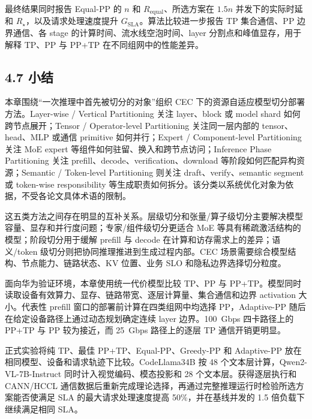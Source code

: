 最终结果同时报告 Equal-PP 的 \(n\) 和 \(R_{\mathrm{equal}}\)、所选方案在 \(1.5n\) 并发下的实际时延和 \(R_{\star}\)，以及请求处理速度提升 \(G_{\mathrm{SLA}}\)。算法比较进一步报告 TP 集合通信、PP 边界通信、各 stage 的计算时间、流水线空泡时间、layer 分割点和峰值显存，用于解释 TP、PP 与 PP+TP 在不同组网中的性能差异。
\subsection*{4.7 小结}

本章围绕“一次推理中首先被切分的对象”组织 CEC 下的资源自适应模型切分部署方法。Layer-wise / Vertical Partitioning 关注 layer、block 或 model shard 如何跨节点展开；Tensor / Operator-level Partitioning 关注同一层内部的 tensor、head、MLP 或通信 primitive 如何并行；Expert / Component-level Partitioning 关注 MoE expert 等组件如何驻留、换入和跨节点访问；Inference Phase Partitioning 关注 prefill、decode、verification、download 等阶段如何匹配异构资源；Semantic / Token-level Partitioning 则关注 draft、verify、semantic segment 或 token-wise responsibility 等生成职责如何拆分。该分类以系统优化对象为依据，不受各论文具体术语的限制。

这五类方法之间存在明显的互补关系。层级切分和张量/算子级切分主要解决模型容量、显存和并行度问题；专家/组件级切分更适合 MoE 等具有稀疏激活结构的模型；阶段切分用于缓解 prefill 与 decode 在计算和访存需求上的差异；语义/token 级切分则把协同推理推进到生成过程内部。CEC 场景需要综合模型结构、节点能力、链路状态、KV 位置、业务 SLO 和隐私边界选择切分粒度。

面向华为验证环境，本章使用统一代价模型比较 TP、PP 与 PP+TP。模型同时读取设备有效算力、显存、链路带宽、逐层计算量、集合通信和边界 activation 大小。代表性 prefill 窗口的部署前计算在四类组网中均选择 PP，Adaptive-PP 随后在给定设备路径上通过动态规划确定连续 layer 边界。100~Gbps 四卡路径上的 PP+TP 与 PP 较为接近，而 25~Gbps 路径上的逐层 TP 通信开销更明显。

正式实验将纯 TP、最佳 PP+TP、Equal-PP、Greedy-PP 和 Adaptive-PP 放在相同模型、设备和请求轨迹下比较。CodeLlama34B 按 48 个文本层计算，Qwen2-VL-7B-Instruct 同时计入视觉编码、模态投影和 28 个文本层。获得逐层执行和 CANN/HCCL 通信数据后重新完成理论选择，再通过完整推理运行时检验所选方案能否使满足 SLA 的最大请求处理速度提高 50\%，并在基线并发的 1.5 倍负载下继续满足相同 SLA。
